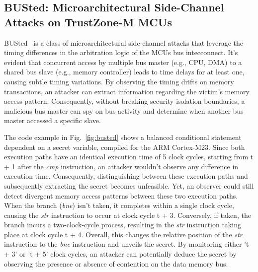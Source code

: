 \subsection{BUSted: Microarchitectural Side-Channel Attacks on TrustZone-M MCUs}
%
BUSted~\cite{busted} is a class of microarchitectural side-channel
attacks that leverage the timing differences in the arbitration
logic of the MCUs bus intecconnect. It's evident that concurrent access by
multiple bus master (e.g., CPU, DMA) to a shared bus slave (e.g., memory
controller) leads to time delays for at least one, causing subtle timing
variations. By observing the timing drifts on memory transactions, an
attacker can extract information regarding the victim’s memory access
pattern. Consequently, without breaking security isolation boundaries, a
malicious bus master can spy on bus activity and determine when another bus
master accessed a specific slave.


The code example in Fig.~\ref{fig:busted} shows a balanced conditional statement dependent on a
secret variable, compiled for the ARM Cortex-M23. Since both
execution paths have an identical execution time of 5 clock cycles,
starting from t + 1 after the \textit{cmp} instruction, an attacker
wouldn't observe any difference in execution time. Consequently,
distinguishing between these execution paths and subsequently extracting
the secret becomes unfeasible. Yet, an observer could still detect
divergent memory access patterns between these two execution paths. When
the branch (\textit{bne}) isn't taken, it completes within a single clock
cycle, causing the \textit{str} instruction to occur at clock cycle t + 3.
Conversely, if taken, the branch incurs a two-clock-cycle process,
resulting in the \textit{str} instruction taking place at clock cycle t +
4. Overall, this changes the relative position of the \textit{str}
instruction to the \textit{bne} instruction and unveils the secret. By
monitoring either 't + 3' or 't + 5' clock cycles, an attacker can
potentially deduce the secret by observing the presence or absence of
contention on the data memory bus.

